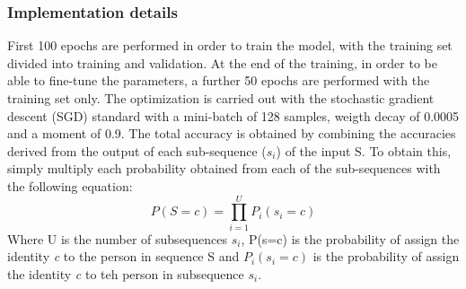 \subsubsection{Implementation details}
First 100 epochs are performed in order to train the model, with the training 
set divided into training and validation. At the end of the training, in order to 
be able to fine-tune the parameters, a further 50 epochs are performed with 
the training set only. The optimization is carried out with the stochastic 
gradient descent (SGD) standard with a mini-batch of 128 samples, weigth 
decay of 0.0005 and a moment of 0.9. The total accuracy is obtained by 
combining the accuracies derived from the output of each sub-sequence ($ s_i $) 
of the input S. To obtain this, simply multiply each probability obtained 
from each of the sub-sequences with the following equation:
\begin{equation}
    P(S=c) = \prod_{i=1}^UP_i(s_i=c)
\end{equation}
Where U is the number of subsequences $ s_i $, P(s=c) is the probability of assign the identity \emph{c} to the person in sequence S and $ P_i(s_i=c) $ is the probability of assign the identity \emph{c} to teh person in subsequence $ s_i $.

